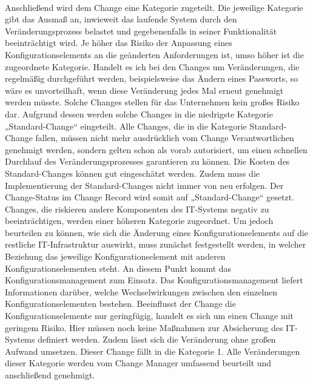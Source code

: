 \\
Anschließend wird dem Change eine Kategorie zugeteilt. Die jeweilige Kategorie gibt das Ausmaß an, inwieweit das laufende System durch den Veränderungsprozess belastet und gegebenenfalls in seiner Funktionalität beeinträchtigt wird. Je höher das Risiko der Anpassung eines Konfigurationselements an die geänderten Anforderungen ist, umso höher ist die zugeordnete Kategorie. Handelt es ich bei den Changes um Veränderungen, die regelmäßig durchgeführt werden, beispielsweise das Ändern eines Passworts, so wäre es unvorteilhaft, wenn diese Veränderung jedes Mal erneut genehmigt werden müsste. Solche Changes stellen für das Unternehmen kein großes Risiko dar. Aufgrund dessen werden solche Changes in die niedrigste Kategorie „Standard-Change“ eingeteilt. Alle Changes, die in die Kategorie Standard-Change fallen, müssen nicht mehr ausdrücklich vom Change Verantwortlichen genehmigt werden, sondern gelten schon als vorab autorisiert, um einen schnellen Durchlauf des Veränderungsprozesses garantieren zu können. Die Kosten des Standard-Changes können gut eingeschätzt werden. Zudem muss die Implementierung der Standard-Changes nicht immer von neu erfolgen. Der Change-Status im Change Record wird somit auf „Standard-Change“ gesetzt.
\\
Changes, die riskieren andere Komponenten des IT-Systems negativ zu beeinträchtigen, werden einer höheren Kategorie zugeordnet. Um jedoch beurteilen zu können, wie sich die Änderung eines Konfigurationselements auf die restliche IT-Infrastruktur auswirkt, muss zunächst festgestellt werden, in welcher Beziehung das jeweilige Konfigurationselement mit anderen Konfigurationselementen steht. An diesem Punkt kommt das Konfigurationsmanagement zum Einsatz. Das Konfigurationsmanagement liefert Informationen darüber,  welche Wechselwirkungen zwischen den einzelnen Konfigurationselementen bestehen. Beeinflusst der Change die Konfigurationselemente nur geringfügig, handelt es sich um einen Change mit geringem Risiko. Hier müssen noch keine Maßnahmen zur Absicherung des IT-Systems definiert werden. Zudem lässt sich die Veränderung ohne großen Aufwand umsetzen. Dieser Change fällt in die Kategorie 1. Alle Veränderungen dieser Kategorie werden vom Change Manager umfassend beurteilt und anschließend genehmigt. 

